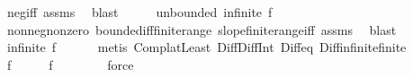 \begin{isabellebody}
\ neg{\isacharunderscore}{\kern0pt}iff\ assms\ \isamarkupfalse%
\ blast\isanewline
\ \ \isamarkupfalse%
\ \isamarkupfalse%
\ unbounded{\isacharcolon}{\kern0pt}\ {\isachardoublequoteopen}infinite\ {\isacharparenleft}{\kern0pt}f\ {\isacharbackquote}{\kern0pt}\ {\isacharbraceleft}{\kern0pt}{}{\isachardot}{\kern0pt}{\isachardot}{\kern0pt}{\isacharbraceright}{\kern0pt}{\isacharparenright}{\kern0pt}{\isachardoublequoteclose}\ \isamarkupfalse%
\ nonneg{\isacharunderscore}{\kern0pt}nonzero\ bounded{\isacharunderscore}{\kern0pt}iff{\isacharunderscore}{\kern0pt}finite{\isacharunderscore}{\kern0pt}range\ slope{\isacharunderscore}{\kern0pt}finite{\isacharunderscore}{\kern0pt}range{\isacharunderscore}{\kern0pt}iff\ assms\ \isamarkupfalse%
\ blast\isanewline
\ \ \isamarkupfalse%
\ \isamarkupfalse%
\ {\isachardoublequoteopen}infinite\ {\isacharparenleft}{\kern0pt}f\ {\isacharbackquote}{\kern0pt}\ {\isacharbraceleft}{\kern0pt}{}{\isachardot}{\kern0pt}{\isachardot}{\kern0pt}{\isacharbraceright}{\kern0pt}\ {\isasyminter}\ {\isacharbraceleft}{\kern0pt}{}{\isachardot}{\kern0pt}{\isachardot}{\kern0pt}{\isacharbraceright}{\kern0pt}{\isacharparenright}{\kern0pt}{\isachardoublequoteclose}\ \isamarkupfalse%
\ {\isacharparenleft}{\kern0pt}metis\ Compl{\isacharunderscore}{\kern0pt}atLeast\ Diff{\isacharunderscore}{\kern0pt}Diff{\isacharunderscore}{\kern0pt}Int\ Diff{\isacharunderscore}{\kern0pt}eq\ Diff{\isacharunderscore}{\kern0pt}infinite{\isacharunderscore}{\kern0pt}finite{\isacharparenright}{\kern0pt}\isanewline
\ \ \isamarkupfalse%
\ \isamarkupfalse%
\ {\isachardoublequoteopen}f\ {\isacharbackquote}{\kern0pt}\ {\isacharbraceleft}{\kern0pt}{}{\isachardot}{\kern0pt}{\isachardot}{\kern0pt}{\isacharbraceright}{\kern0pt}\ {\isasyminter}\ {\isacharbraceleft}{\kern0pt}{}{\isacharless}{\kern0pt}{\isachardot}{\kern0pt}{\isachardot}{\kern0pt}{\isacharbraceright}{\kern0pt}\ {\isacharequal}{\kern0pt}\ f\ {\isacharbackquote}{\kern0pt}\ {\isacharbraceleft}{\kern0pt}{}{\isachardot}{\kern0pt}{\isachardot}{\kern0pt}{\isacharbraceright}{\kern0pt}\ {\isasyminter}\ {\isacharbraceleft}{\kern0pt}{}{\isachardot}{\kern0pt}{\isachardot}{\kern0pt}{\isacharbraceright}{\kern0pt}\ {\isacharminus}{\kern0pt}\ {\isacharbraceleft}{\kern0pt}{}{\isacharbraceright}{\kern0pt}{\isachardoublequoteclose}\ \isamarkupfalse%
\ force\isanewline

\end{isabellebody}
